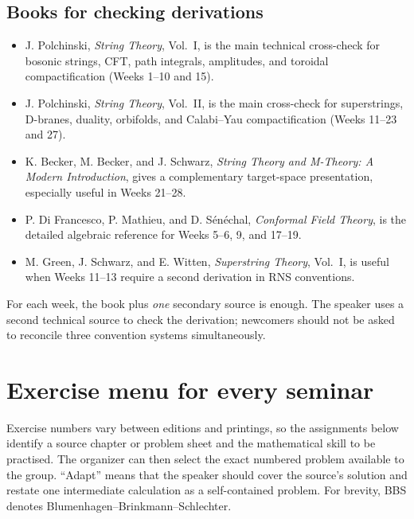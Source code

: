 \documentclass[11pt]{article}
\begin{document}
\subsection{Books for checking derivations}

\begin{itemize}
  \item J. Polchinski, \emph{String Theory}, Vol.~I, is the main technical
  cross-check for bosonic strings, CFT, path integrals, amplitudes, and toroidal
  compactification (Weeks 1--10 and 15).
  \item J. Polchinski, \emph{String Theory}, Vol.~II, is the main cross-check
  for superstrings, D-branes, duality, orbifolds, and Calabi--Yau compactification
  (Weeks 11--23 and 27).
  \item K. Becker, M. Becker, and J. Schwarz, \emph{String Theory and M-Theory:
  A Modern Introduction}, gives a complementary target-space presentation,
  especially useful in Weeks 21--28.
  \item P. Di Francesco, P. Mathieu, and D. S\'en\'echal, \emph{Conformal Field
  Theory}, is the detailed algebraic reference for Weeks 5--6, 9, and 17--19.
  \item M. Green, J. Schwarz, and E. Witten, \emph{Superstring Theory}, Vol.~I,
  is useful when Weeks 11--13 require a second derivation in RNS conventions.
\end{itemize}

\begin{warningbox}
For each week, the book plus \emph{one} secondary source is enough.  The speaker
uses a second technical source to check the derivation; newcomers should not be
asked to reconcile three convention systems simultaneously.
\end{warningbox}

\section{Exercise menu for every seminar}

Exercise numbers vary between editions and printings, so the assignments below
identify a source chapter or problem sheet and the mathematical skill to be
practised.  The organizer can then select the exact numbered problem available
to the group.  ``Adapt'' means that the speaker should cover the source's
solution and restate one intermediate calculation as a self-contained problem.
For brevity, BBS denotes Blumenhagen--Brinkmann--Schlechter.
\end{document}
